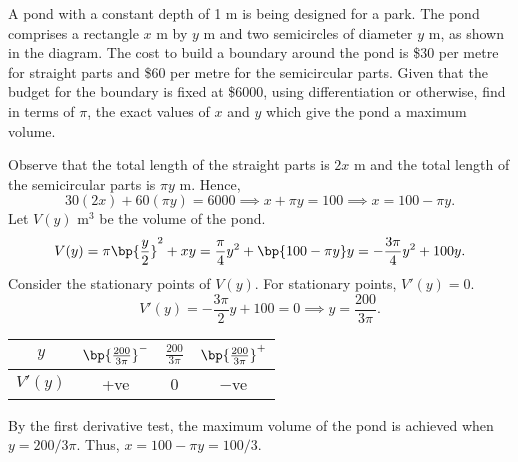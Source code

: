 \clearpage
\begin{problem}
    \begin{center}
    \end{center}

    A pond with a constant depth of 1 m is being designed for a park. The pond comprises a rectangle $x$ m by $y$ m and two semicircles of diameter $y$ m, as shown in the diagram. The cost to build a boundary around the pond is \$30 per metre for straight parts and \$60 per metre for the semicircular parts. Given that the budget for the boundary is fixed at \$6000, using differentiation or otherwise, find in terms of $\pi$, the exact values of $x$ and $y$ which give the pond a maximum volume.
\end{problem}
\begin{solution}
    Observe that the total length of the straight parts is $2x$ m and the total length of the semicircular parts is $\pi y$ m. Hence, \[30(2x) + 60(\pi y) = 6000 \implies x + \pi y = 100 \implies x = 100 - \pi y.\] Let $V(y)$ m$^3$ be the volume of the pond. \[V(y) = \pi \bp{\frac{y}{2}}^2 + xy = \frac{\pi}{4} y^2 + \bp{100 - \pi y}y = -\frac{3\pi}4 y^2 + 100 y.\] Consider the stationary points of $V(y)$. For stationary points, $V'(y) = 0$. \[V'(y) = -\frac{3\pi}2 y + 100 = 0 \implies y = \frac{200}{3\pi}.\]

    \begin{table}[h]
        \centering
        \begin{tabular}{|c|c|c|c|}
        \hline
        $y$ & $\bp{\frac{200}{3\pi}}^-$ & $\frac{200}{3\pi}$ & $\bp{\frac{200}{3\pi}}^+$ \\\hline
        $V'(y)$ & +ve   & 0 & $-$ve   \\\hline
        \end{tabular}
    \end{table}

    By the first derivative test, the maximum volume of the pond is achieved when $y = 200/3\pi$. Thus, $x = 100 - \pi y = 100/3$.
\end{solution}

